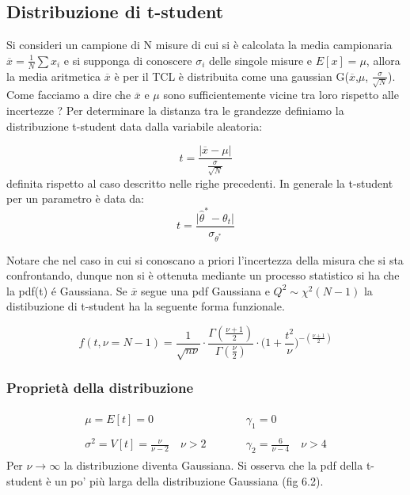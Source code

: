 \documentclass[11pt,a4paper]{book}
\begin{document}
 \subsection{Distribuzione di t-student}
 Si consideri un campione di N misure di cui si \`{e} calcolata la media campionaria $\overline{x} = \frac{1}{N} \sum x_i$ e si supponga di conoscere $\sigma_i$ delle singole misure e $E[x] = \mu$, allora la media aritmetica $\overline{x}$ \`{e} per il TCL \`{e} distribuita come una gaussian G($\overline{x}$,$\mu$, $\frac{\sigma}{\sqrt{N}}$). Come facciamo a dire che $\overline{x}$ e ${\mu}$ sono sufficientemente vicine tra loro rispetto alle incertezze ?
 \newline
 Per determinare la distanza tra le grandezze definiamo la distribuzione t-student data dalla variabile aleatoria:
 
 \begin{equation*}
 	t = \dfrac{\vert \overline{x} - \mu\vert }{\frac{\sigma}{\sqrt{N}}}
 \end{equation*}
 definita rispetto al caso descritto nelle righe precedenti. In generale la t-student per un parametro \`{e} data da:
 \begin{equation}
 	t = \dfrac{\vert \hat{\theta}^* - \theta_t \vert}{\sigma_{\theta^*}}
 \end{equation}
 
 Notare che nel caso in cui si conoscano a priori l'incertezza della misura che si sta confrontando, dunque non si \`{e} ottenuta mediante un processo statistico si ha che la pdf(t) \'{e} Gaussiana.
 Se $\overline{x}$ segue una pdf Gaussiana e $Q^2 \sim \chi^2(N-1)$ la distibuzione di t-student ha la seguente forma funzionale.
 
 \begin{equation}
 	f(t,\nu = N-1) = \dfrac{1}{\sqrt{n\nu}} \cdot \dfrac{\Gamma({\frac{\nu+1}{2}})}{\Gamma(\frac{\nu}{2})} \cdot \Big (1 + \frac{t^2}{\nu} \Big) ^{-(\frac{\nu+1}{2})}
 \end{equation}
 
 \subsubsection{Propriet\`{a} della distribuzione}
 \begin{align*}
 	\begin{matrix}
 		\mu = E[t] = 0 & \quad \quad & \gamma_1 = 0 \\
 		\\
 		\sigma^2 = V[t] = \frac{\nu}{\nu-2} \quad \nu > 2 & \quad \quad & \gamma_2 = \frac{6}{\nu-4} \quad \nu > 4
 	\end{matrix}	
 \end{align*}
 \newline
 Per $\nu \rightarrow \infty$ la distribuzione diventa Gaussiana. Si osserva che la pdf della t-student \`{e} un po' pi\`{u} larga della distribuzione Gaussiana (fig 6.2).
 
\end{document}
